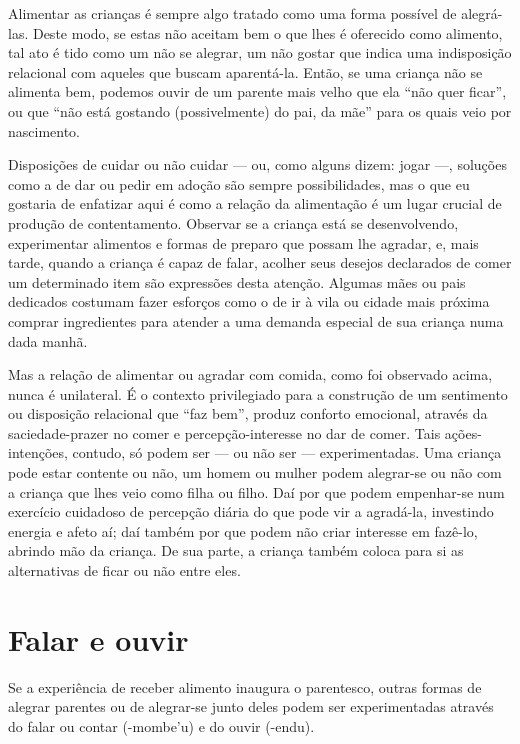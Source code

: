 Alimentar as crianças é sempre algo tratado como uma forma possível de
alegrá-las. Deste modo, se estas não aceitam bem o que lhes é oferecido
como alimento, tal ato é tido como um não se alegrar, um não gostar que
indica uma indisposição relacional com aqueles que buscam aparentá-la.
Então, se uma criança não se alimenta bem, podemos ouvir de um parente
mais velho que ela ``não quer ficar'', ou que ``não está gostando
(possivelmente) do pai, da mãe'' para os quais veio por nascimento.

Disposições de cuidar ou não cuidar — ou, como alguns dizem: jogar —,
soluções como a de dar ou pedir em adoção são sempre possibilidades,
mas o que eu gostaria de enfatizar aqui é como a relação da alimentação
é um lugar crucial de produção de contentamento. Observar se a criança
está se desenvolvendo, experimentar alimentos e formas de preparo que
possam lhe agradar, e, mais tarde, quando a criança é capaz de falar,
acolher seus desejos declarados de comer um determinado item são
expressões desta atenção. Algumas mães ou pais dedicados costumam fazer
esforços como o de ir à vila ou cidade mais próxima comprar
ingredientes para atender a uma demanda especial de sua criança numa
dada manhã.

Mas a relação de alimentar ou agradar com comida, como foi observado
acima, nunca é unilateral. É o contexto privilegiado para a construção
de um sentimento ou disposição relacional que ``faz bem'', produz
conforto emocional, através da saciedade-prazer no comer e
percepção-interesse no dar de comer. Tais ações-intenções, contudo, só
podem ser — ou não ser — experimentadas. Uma criança pode estar
contente ou não, um homem ou mulher podem alegrar-se ou não com a
criança que lhes veio como filha ou filho. Daí por que podem
empenhar-se num exercício cuidadoso de percepção diária do que pode vir
a agradá-la, investindo energia e afeto aí; daí também por que podem
não criar interesse em fazê-lo, abrindo mão da criança. De sua parte, a
criança também coloca para si as alternativas de ficar ou não entre
eles. 

\section{Falar e ouvir}

Se a experiência de receber alimento inaugura o parentesco, outras
formas de alegrar parentes ou de alegrar-se junto deles podem ser
experimentadas através do falar ou contar (-mombe’u) e do ouvir
(-endu).

